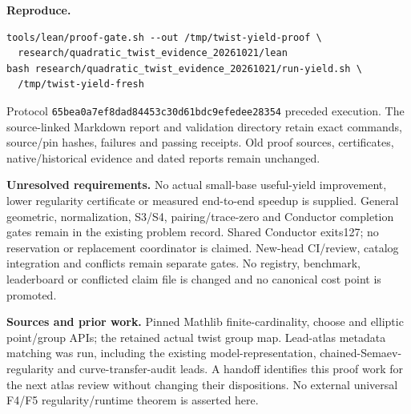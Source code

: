 \documentclass[10pt]{article}
\begin{document}
\textbf{Reproduce.}
\begin{verbatim}
tools/lean/proof-gate.sh --out /tmp/twist-yield-proof \
  research/quadratic_twist_evidence_20261021/lean
bash research/quadratic_twist_evidence_20261021/run-yield.sh \
  /tmp/twist-yield-fresh
\end{verbatim}
Protocol \texttt{65bea0a7ef8dad84453c30d61bdc9efedee28354} preceded execution.
The source-linked Markdown report and validation directory retain exact commands,
source/pin hashes, failures and passing receipts. Old proof sources, certificates,
native/historical evidence and dated reports remain unchanged.

\textbf{Unresolved requirements.} No actual small-base useful-yield improvement,
lower regularity certificate or measured end-to-end speedup is supplied. General
geometric, normalization, S3/S4, pairing/trace-zero and Conductor completion gates
remain in the existing problem record. Shared Conductor exits127; no reservation
or replacement coordinator is claimed. New-head CI/review, catalog integration
and conflicts remain separate gates. No registry, benchmark, leaderboard or
conflicted claim file is changed and no canonical cost point is promoted.

\textbf{Sources and prior work.} Pinned Mathlib finite-cardinality, choose and
elliptic point/group APIs; the retained actual twist group map. Lead-atlas
metadata matching was run, including the existing model-representation,
chained-Semaev-regularity and curve-transfer-audit leads. A handoff identifies
this proof work for the next atlas review without changing their dispositions.
No external universal F4/F5 regularity/runtime theorem is asserted here.
\end{document}
